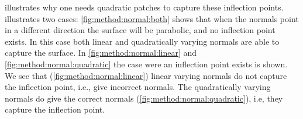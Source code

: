 	 illustrates why one needs quadratic patches to capture these inflection points.  illustrates two cases: \cref{fig:method:normal:both} shows that when the normals point in a different direction the surface will be parabolic, and no inflection point exists. In this case both linear and quadratically varying normals are able to capture the surface. In \cref{fig:method:normal:linear} and \cref{fig:method:normal:quadratic} the case were an inflection point exists is shown. We see that (\cref{fig:method:normal:linear}) linear varying normals do not capture the inflection point, i.e., give incorrect normals. The quadratically varying normals do give the correct normals (\cref{fig:method:normal:quadratic}), i.e, they capture the inflection point.

